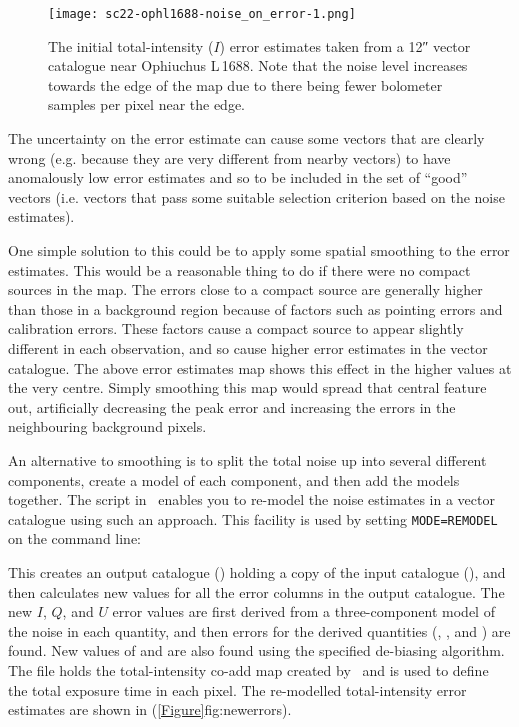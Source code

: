 \begin{figure}[ht!]
\begin{center}
\texttt{[image: sc22-ophl1688-noise\_on\_error-1.png]}
\caption [Original Error Estimates in POL-2 Vector Catalogue for Oph L\,1688]{
  The initial total-intensity ($I$) error estimates taken from a 12\si{\arcsecond} vector
  catalogue near Ophiuchus L\,1688. Note that the noise level increases towards the edge
  of the map due to there being fewer bolometer samples per pixel near the edge.
\label{fig:originalerrors}
}
\end{center}
\end{figure}

The uncertainty on the error estimate can cause some vectors that are clearly
wrong (e.g. because they are very different from nearby vectors) to have
anomalously low error estimates and so to be included in the set of ``good''
vectors (i.e. vectors that pass some suitable selection criterion based on the
noise estimates).

One simple solution to this could be to apply some spatial smoothing
to the error estimates. This would be a reasonable thing to do if
there were no compact sources in the map. The errors close to a
compact source are generally higher than those in a background region
because of factors such as pointing errors and calibration errors.
These factors cause a compact source to appear slightly different in
each observation, and so cause higher error estimates in the vector
catalogue. The above error estimates map shows this effect in the
higher values at the very centre. Simply smoothing this map would
spread that central feature out, artificially decreasing the peak
error and increasing the errors in the neighbouring background pixels.

An alternative to smoothing is to split the total noise up into
several different components, create a model of each component, and
then add the models together. The  script in \smurf\
enables you to re-model the noise estimates in a vector catalogue
using such an approach. This facility is used by setting
\texttt{MODE=REMODEL} on the  command line:

\begin{terminalv}
\end{terminalv}

This creates an output catalogue () holding a copy of
the input catalogue (\file{mycat.FIT}), and then calculates new values
for all the error columns in the output catalogue. The new $I$, $Q$,
and $U$ error values are first derived from a three-component model of
the noise in each quantity, and then errors for the derived quantities
(, , and \catcol{ANG}) are found. New values of
\catcol{PI} and \catcol{P} are also found using
the specified de-biasing algorithm. The file  holds the
total-intensity co-add map created by \poltwomap\ and is used to define
the total exposure time in each pixel. The re-modelled total-intensity
error estimates are shown in (\cref{Figure}{fig:newerrors}{}).


